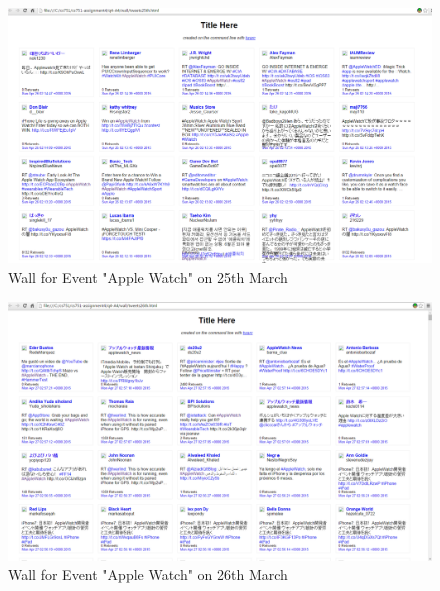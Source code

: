 \documentclass[12pt]{Report}
\begin{document}
\begin{figure}[ht]    
    \begin{center}
        \includegraphics[scale=0.60]{wall25th.png}
        \caption{Wall for Event "Apple Watch" on 25th March }
        \label{Wall for Event "Apple Watch" on 25th March}
    \end{center}
\end{figure}


\begin{figure}[ht]    
    \begin{center}
        \includegraphics[scale=0.60]{wall26th.png}
        \caption{Wall for Event "Apple Watch" on 26th March }
        \label{Wall for Event "Apple Watch" on 26th March}
    \end{center}
\end{figure}

\newpage
\end{document}
